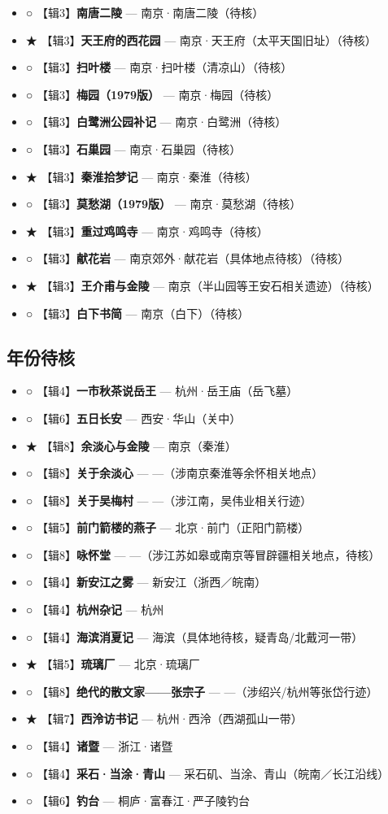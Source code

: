 \documentclass[UTF8,fontset=none,zihao=-4,a4paper]{ctexart}
\begin{document}
\begin{itemize}
\item ○ 【辑3】\textbf{南唐二陵} — 南京·南唐二陵（待核）
\item ★ 【辑3】\textbf{天王府的西花园} — 南京·天王府（太平天国旧址）（待核）
\item ○ 【辑3】\textbf{扫叶楼} — 南京·扫叶楼（清凉山）（待核）
\item ○ 【辑3】\textbf{梅园（1979版）} — 南京·梅园（待核）
\item ○ 【辑3】\textbf{白鹭洲公园补记} — 南京·白鹭洲（待核）
\item ○ 【辑3】\textbf{石巢园} — 南京·石巢园（待核）
\item ★ 【辑3】\textbf{秦淮拾梦记} — 南京·秦淮（待核）
\item ○ 【辑3】\textbf{莫愁湖（1979版）} — 南京·莫愁湖（待核）
\item ★ 【辑3】\textbf{重过鸡鸣寺} — 南京·鸡鸣寺（待核）
\item ○ 【辑3】\textbf{献花岩} — 南京郊外·献花岩（具体地点待核）（待核）
\item ★ 【辑3】\textbf{王介甫与金陵} — 南京（半山园等王安石相关遗迹）（待核）
\item ○ 【辑3】\textbf{白下书简} — 南京（白下）（待核）
\end{itemize}


\subsection{年份待核}


\begin{itemize}
\item ○ 【辑4】\textbf{一市秋茶说岳王} — 杭州·岳王庙（岳飞墓）
\item ○ 【辑6】\textbf{五日长安} — 西安·华山（关中）
\item ★ 【辑8】\textbf{余淡心与金陵} — 南京（秦淮）
\item ○ 【辑8】\textbf{关于余淡心} — —（涉南京秦淮等余怀相关地点）
\item ○ 【辑8】\textbf{关于吴梅村} — —（涉江南，吴伟业相关行迹）
\item ○ 【辑5】\textbf{前门箭楼的燕子} — 北京·前门（正阳门箭楼）
\item ○ 【辑8】\textbf{咏怀堂} — —（涉江苏如皋或南京等冒辟疆相关地点，待核）
\item ○ 【辑4】\textbf{新安江之雾} — 新安江（浙西／皖南）
\item ○ 【辑4】\textbf{杭州杂记} — 杭州
\item ○ 【辑4】\textbf{海滨消夏记} — 海滨（具体地待核，疑青岛/北戴河一带）
\item ★ 【辑5】\textbf{琉璃厂} — 北京·琉璃厂
\item ○ 【辑8】\textbf{绝代的散文家——张宗子} — —（涉绍兴/杭州等张岱行迹）
\item ★ 【辑7】\textbf{西泠访书记} — 杭州·西泠（西湖孤山一带）
\item ○ 【辑4】\textbf{诸暨} — 浙江·诸暨
\item ○ 【辑4】\textbf{采石·当涂·青山} — 采石矶、当涂、青山（皖南／长江沿线）
\item ○ 【辑6】\textbf{钓台} — 桐庐·富春江·严子陵钓台
\end{itemize}
\end{document}
